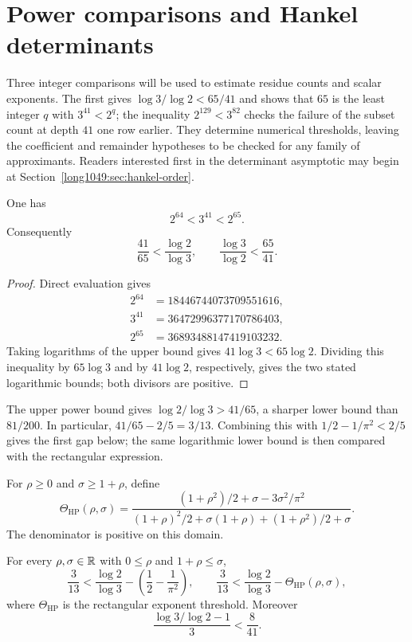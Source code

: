 \documentclass[11pt]{article}
\begin{document}
\section{Power comparisons and Hankel determinants}\label{long1049:sec:sharp}

Three integer comparisons will be used to estimate residue counts
and scalar exponents. The first gives $\log3/\log2<65/41$ and shows
that $65$ is the least integer $q$ with $3^{41}<2^q$; the inequality
$2^{129}<3^{82}$ checks the failure of the subset count at depth $41$
one row earlier. They determine numerical thresholds, leaving the
coefficient and remainder hypotheses to be checked for any family
of approximants. Readers interested first in the determinant
asymptotic may begin at Section~\ref{long1049:sec:hankel-order}.

\begin{theorem}\label{long1049:res:powerbracket}
One has
\[
 2^{64}<3^{41}<2^{65}.
\]
Consequently
\[
 \frac{41}{65}<\frac{\log2}{\log3},
 \qquad
 \frac{\log3}{\log2}<\frac{65}{41}.
\]
\end{theorem}

\begin{proof}
Direct evaluation gives
\[
 \begin{aligned}
 2^{64}&=18446744073709551616,\\
 3^{41}&=36472996377170786403,\\
 2^{65}&=36893488147419103232.
 \end{aligned}
\]
Taking logarithms of the upper bound gives $41\log3<65\log2$.
Dividing this inequality by $65\log3$ and by $41\log2$, respectively,
gives the two stated logarithmic bounds; both divisors are positive.
\end{proof}

The upper power bound gives $\log2/\log3>41/65$, a sharper lower
bound than $81/200$. In particular,
$41/65-2/5=3/13$. Combining this with
$1/2-1/\pi^2<2/5$ gives the first gap below; the same logarithmic
lower bound is then compared with the rectangular expression.

For $\rho\ge0$ and $\sigma\ge1+\rho$, define
\[
 \Theta_{\mathrm{HP}}(\rho,\sigma)=
 \frac{(1+\rho^2)/2+\sigma-3\sigma^2/\pi^2}
 {(1+\rho)^2/2+\sigma(1+\rho)+(1+\rho^2)/2+\sigma}.
\]
The denominator is positive on this domain.

\begin{corollary}\label{long1049:res:sharpgaps}
For every $\rho,\sigma\in\mathbb{R}$ with $0\le\rho$ and $1+\rho\le\sigma$,
\[
 \frac3{13}<\frac{\log2}{\log3}
   -\left(\frac12-\frac1{\pi^2}\right),
 \qquad
 \frac3{13}<\frac{\log2}{\log3}-\Theta_{\mathrm{HP}}(\rho,\sigma),
\]
where $\Theta_{\mathrm{HP}}$ is the rectangular exponent threshold.  Moreover
\[
 \frac{\log3/\log2-1}{3}<\frac8{41}.
\]
\end{corollary}
\end{document}

